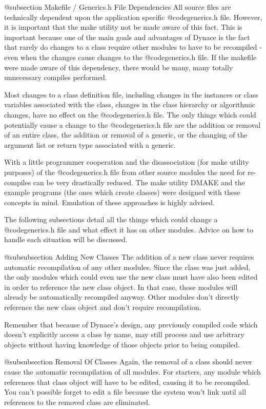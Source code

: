 @subsection Makefile / Generics.h File Dependencies
All source files are technically dependent upon the application specific
@code{generics.h} file.  However, it is important that the make utility
not be made aware of this fact.  This is important because one of the main
goals and advantages of Dynace is the fact that rarely do changes to a class
require other modules to have to be recompiled - even when the changes
cause changes to the @code{generics.h} file.  If the makefile were
made aware of this dependency, there would be many, many totally
unnecessary compiles performed.

Most changes to a class definition file, including changes in the
instances or class variables associated with the class, changes in the
class hierarchy or algorithmic changes, have no effect on the
@code{generics.h} file.  The only things which could potentially cause a
change to the @code{generics.h} file are the addition or removal of an
entire class, the addition or removal of a generic, or the changing of
the argument list or return type associated with a generic.

With a little programmer cooperation and the disassociation (for make
utility purposes) of the @code{generics.h} file from other source
modules the need for re-compiles can be very drastically reduced.  The
make utility DMAKE and the example programs (the ones which create
classes) were designed with these concepts in mind.  Emulation of
these approaches is highly advised.

The following subsections detail all the things which could change
a @code{generics.h} file and what effect it has on other modules.
Advice on how to handle each situation will be discussed.

@subsubsection Adding New Classes
The addition of a new class never requires automatic recompilation
of any other modules.  Since the class was just added, the only modules
which could even use the new class must have also been edited in
order to reference the new class object.  In that case, those modules
will already be automatically recompiled anyway.  Other modules
don't directly reference the new class object and don't require
recompilation.

Remember that because of Dynace's design, any previously compiled code
which doesn't explicitly access a class by name, may still process
and use arbitrary objects without having knowledge of those objects
prior to being compiled.

@subsubsection Removal Of Classes
Again, the removal of a class should never cause the automatic
recompilation of all modules.  For starters, any module which
references that class object will have to be edited, causing it to
be recompiled.  You can't possible forget to edit a file because
the system won't link until all references to the removed class
are eliminated.

